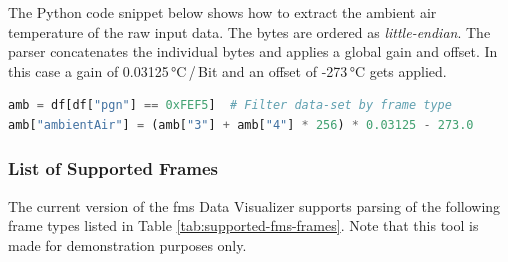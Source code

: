 The Python code snippet below shows how to extract the ambient air temperature of the raw input data. The bytes are ordered as \textit{little-endian}. The parser concatenates the individual bytes and applies a global gain and offset. In this case a gain of 0.03125\,°C\,/\,Bit and an offset of -273\,°C gets applied.

\bigskip
{}
\begin{lstlisting}[backgroundcolor=\color{gray!10},  
                   basicstyle=\ttfamily,
                   columns=fullflexible,
                   breakatwhitespace=false,      
                   breaklines=true,                
                   captionpos=b,                    
                   commentstyle=\color{mygreen}, 
                   extendedchars=true,              
                   frame=single,                   
                   keepspaces=true,             
                   keywordstyle=\color{blue},      
                   language=Python,                 
                   numbers=none,                
                   numbersep=5pt,                   
                   numberstyle=\color{blue}, 
                   rulecolor=\color{mygray},        
                   showspaces=false,
                   showstringspaces=false,
                   showtabs=false,                 
                   stepnumber=5,                  
                   stringstyle=\color{mymauve},    
                   tabsize=2,                      
                   title=\lstname,
                   frame=none,
                   xleftmargin = 1cm,
                   framexleftmargin = 1em]
amb = df[df["pgn"] == 0xFEF5]  # Filter data-set by frame type
amb["ambientAir"] = (amb["3"] + amb["4"] * 256) * 0.03125 - 273.0
\end{lstlisting}
\newpage

\subsubsection{List of Supported Frames}
The current version of the \acrshort{fms} Data Visualizer supports parsing of the following frame types listed in Table \ref{tab:supported-fms-frames}. Note that this tool is made for demonstration purposes only.

